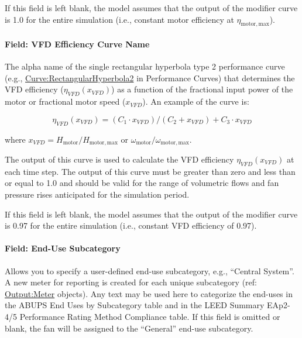 If this field is left blank, the model assumes that the output of the modifier curve is 1.0 for the entire simulation (i.e., constant motor efficiency at \(\eta_{\mathrm{motor, max}}\)).

\paragraph{Field: VFD Efficiency Curve Name}\label{field-vfd-efficiency-curve-name}

The alpha name of the single rectangular hyperbola type 2 performance curve (e.g., \hyperref[curverectangularhyperbola2]{Curve:RectangularHyperbola2} in Performance Curves) that determines the VFD efficiency (\(\eta_{VFD}(x_{VFD})\)) as a function of the fractional input power of the motor or fractional motor speed (\(x_{VFD}\)). An example of the curve is:

\begin{equation}
  \eta_{VFD}(x_{VFD}) = (C_1 \cdot x_{VFD}) / (C_2 + x_{VFD}) + C_3 \cdot x_{VFD}
\end{equation}

where \(x_{VFD} = H_{\mathrm{motor}} / H_{\mathrm{motor, max}}\) or \(\omega_{\mathrm{motor}} / \omega_{\mathrm{motor, max}}\).

The output of this curve is used to calculate the VFD efficiency \(\eta_{VFD}(x_{VFD})\) at each time step. The output of this curve must be greater than zero and less than or equal to 1.0 and should be valid for the range of volumetric flows and fan pressure rises anticipated for the simulation period.

If this field is left blank, the model assumes that the output of the modifier curve is 0.97 for the entire simulation (i.e., constant VFD efficiency of 0.97).

\paragraph{Field: End-Use Subcategory}\label{field-end-use-subcategory-4}

Allows you to specify a user-defined end-use subcategory, e.g., ``Central System''. A new meter for reporting is created for each unique subcategory (ref: \hyperref[outputmeter-and-outputmetermeterfileonly]{Output:Meter} objects). Any text may be used here to categorize the end-uses in the ABUPS End Uses by Subcategory table and in the LEED Summary EAp2-4/5 Performance Rating Method Compliance table. If this field is omitted or blank, the fan will be assigned to the ``General'' end-use subcategory.

